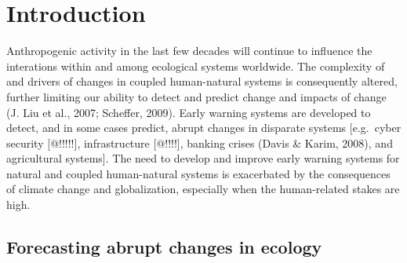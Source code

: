 \documentclass[12pt,twoside,openany]{reedthesis}
\begin{document}
\endgroup{}

\chapter{Introduction}\label{intro}

Anthropogenic activity in the last few decades will continue to
influence the interations within and among ecological systems worldwide.
The complexity of and drivers of changes in coupled human-natural
systems is consequently altered, further limiting our ability to detect
and predict change and impacts of change (J. Liu et al., 2007; Scheffer,
2009). Early warning systems are developed to detect, and in some cases
predict, abrupt changes in disparate systems {[}e.g.~cyber security
{[}@!!!!!{]}, infrastructure {[}@!!!!{]}, banking crises (Davis \&
Karim, 2008), and agricultural systems{]}. The need to develop and
improve early warning systems for natural and coupled human-natural
systems is exacerbated by the consequences of climate change and
globalization, especially when the human-related stakes are high.

\section{Forecasting abrupt changes in
ecology}\label{forecasting-abrupt-changes-in-ecology}
\end{document}
